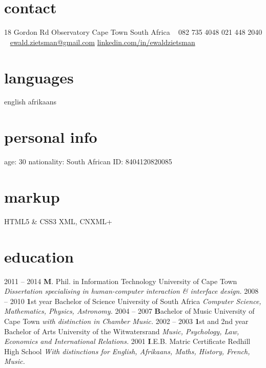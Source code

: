 \documentclass[]{friggeri-cv} %
\begin{document}


\begin{aside} %
\section{contact}
18 Gordon Rd
Observatory
Cape Town
South Africa
~
082 735 4048
021 448 2040
~
\href{mailto:ewald.zietsman@gmail.com}{ewald.zietsman@gmail.com}
\href{http://za.linkedin.com/in/ewaldzietsman/}{linkedin.com/in/ewaldzietsman}
\section{languages}
english 
afrikaans
\section{personal info}
age: 30
nationality: South African
ID: 8404120820085
\section{markup}
HTML5 \& CSS3
XML, CNXML+
\end{aside}


\section{education}

\begin{entrylist}
\entry
{2011 -- 2014}
{\textbf M. Phil. in Information Technology}
{University of Cape Town}
{\emph{Dissertation specialising in human-computer interaction \& interface design.}}
\entry
{2008 -- 2010}
{\textbf 1st year Bachelor of Science}
{University of South Africa}
{\emph{Computer Science, Mathematics, Physics, Astronomy.}}
\entry
{2004 -- 2007}
{\textbf Bachelor of Music}
{University of Cape Town}
{\emph{with distinction in Chamber Music.}}
\entry
{2002 -- 2003}
{\textbf 1st and 2nd year Bachelor of Arts}
{University of the Witwatersrand}
{\emph{Music, Psychology, Law, Economics and International Relations.}}
\entry
{2001}
{\textbf I.E.B. Matric Certificate }
{Redhill High School}
{\emph{With distinctions for English, Afrikaans, Maths, History, French, Music.}}

\end{entrylist}
\end{document}
